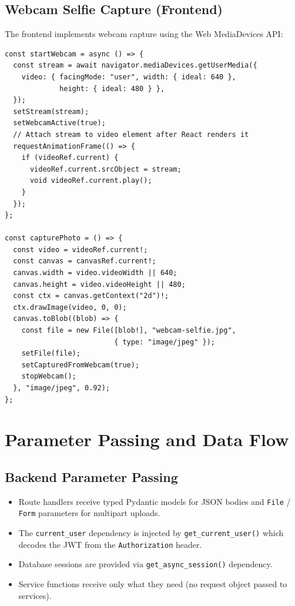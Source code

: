 \subsection{Webcam Selfie Capture (Frontend)}

The frontend implements webcam capture using the Web MediaDevices API:

\begin{lstlisting}[style=tsstyle, caption=Webcam Capture in FaceMatchTab.tsx]
const startWebcam = async () => {
  const stream = await navigator.mediaDevices.getUserMedia({
    video: { facingMode: "user", width: { ideal: 640 },
             height: { ideal: 480 } },
  });
  setStream(stream);
  setWebcamActive(true);
  // Attach stream to video element after React renders it
  requestAnimationFrame(() => {
    if (videoRef.current) {
      videoRef.current.srcObject = stream;
      void videoRef.current.play();
    }
  });
};

const capturePhoto = () => {
  const video = videoRef.current!;
  const canvas = canvasRef.current!;
  canvas.width = video.videoWidth || 640;
  canvas.height = video.videoHeight || 480;
  const ctx = canvas.getContext("2d")!;
  ctx.drawImage(video, 0, 0);
  canvas.toBlob((blob) => {
    const file = new File([blob!], "webcam-selfie.jpg",
                          { type: "image/jpeg" });
    setFile(file);
    setCapturedFromWebcam(true);
    stopWebcam();
  }, "image/jpeg", 0.92);
};
\end{lstlisting}

\section{Parameter Passing and Data Flow}

\subsection{Backend Parameter Passing}
\begin{itemize}
    \item Route handlers receive typed Pydantic models for JSON bodies and \texttt{File} / \texttt{Form} parameters for multipart uploads.
    \item The \texttt{current\_user} dependency is injected by \texttt{get\_current\_user()} which decodes the JWT from the \texttt{Authorization} header.
    \item Database sessions are provided via \texttt{get\_async\_session()} dependency.
    \item Service functions receive only what they need (no request object passed to services).
\end{itemize}


